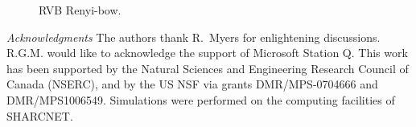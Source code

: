 \documentclass[prl,aps,twocolumn,floatfix,amsmath,amssymb,superscriptaddress,tightenlines]{revtex4}
\begin{document}
 \begin{figure}[ht]
   \begin{center}
   \end{center}
   \caption{RVB Renyi-bow. }
   \label{fig:2}
 \end{figure}

{\it Acknowledgments} 
The authors thank R.~Myers for enlightening discussions. 
R.G.M. would like to acknowledge the support of Microsoft Station Q.
This work has been supported by the Natural Sciences and Engineering
Research Council of Canada (NSERC), and by the US NSF via grants DMR/MPS-0704666 and DMR/MPS1006549.  Simulations were performed on the computing facilities of SHARCNET.



\end{document}
